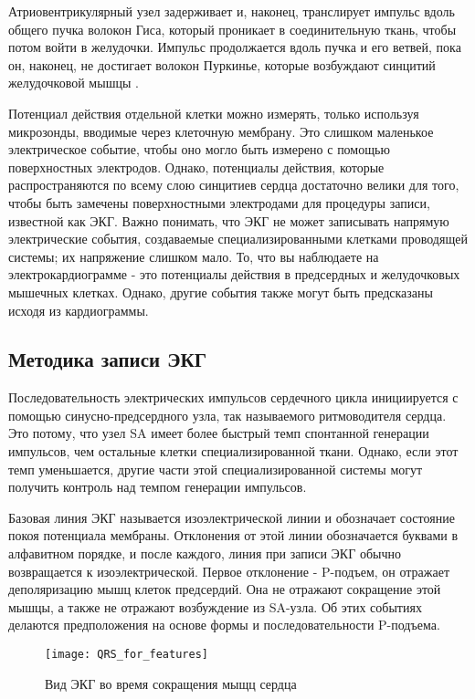 Атриовентрикулярный узел  задерживает и, наконец, транслирует импульс вдоль общего пучка волокон Гиса, который проникает в соединительную ткань, чтобы потом войти в желудочки. Импульс продолжается вдоль пучка и его ветвей, пока он, наконец, не достигает волокон Пуркинье, которые возбуждают синцитий желудочковой мышцы .

Потенциал действия отдельной клетки можно измерять, только используя микрозонды, вводимые через клеточную мембрану. 
Это слишком маленькое электрическое событие, чтобы оно могло быть измерено с помощью поверхностных электродов. Однако, потенциалы действия, которые распространяются по всему слою синцитиев сердца достаточно велики для того, чтобы быть замечены поверхностными электродами для процедуры записи, известной как ЭКГ. Важно понимать, что ЭКГ не может записывать напрямую электрические события, создаваемые специализированными клетками проводящей системы; их напряжение слишком мало. То, что вы наблюдаете на электрокардиограмме - это потенциалы действия в предсердных и желудочковых мышечных клетках. Однако, другие события также могут быть предсказаны исходя из кардиограммы.

\subsection{Методика записи ЭКГ}

Последовательность электрических импульсов сердечного цикла инициируется с помощью синусно-предсердного узла, так называемого ритмоводителя сердца. Это потому, что узел SA имеет более быстрый темп спонтанной генерации импульсов, чем остальные клетки специализированной ткани. Однако, если этот темп уменьшается, другие части этой специализированной системы могут получить контроль над темпом генерации импульсов.

Базовая линия ЭКГ называется изоэлектрической линии и обозначает состояние покоя потенциала мембраны. Отклонения от этой линии обозначается буквами в алфавитном порядке, и после каждого, линия при записи ЭКГ обычно возвращается к изоэлектрической. Первое отклонение - P-подъем, он отражает деполяризацию мышц клеток предсердий. Она не отражают сокращение этой мышцы, а также не отражают возбуждение из SA-узла. Об этих событиях делаются предположения на основе формы и последовательности P-подъема. 

\begin{figure}[h!]
	\begin{center}
		\texttt{[image: QRS\_for\_features]}
		\caption{Вид ЭКГ во время сокращения мыщц сердца}
		\label{ris:QRS}
	\end{center}
\end{figure}

